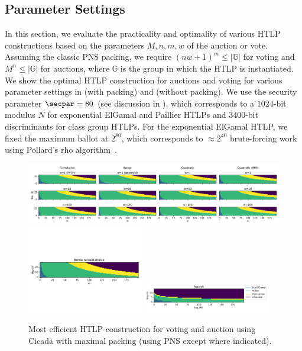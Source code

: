 \subsection{Parameter Settings}\label{sec:htlp-choice}

In this section, we evaluate the practicality and optimality of various HTLP constructions based on the parameters $M,n,m,w$ of the auction or vote. 
Assuming the classic PNS packing, we require $(nw+1)^m\leq\vert\mathbb{G}\vert$ for voting and $M^n\leq\vert\mathbb{G}\vert$ for auctions, where $\mathbb{G}$ is the group in which the HTLP is instantiated.
We show the optimal HTLP construction for auctions and voting for various parameter settings in  (with packing) and  (without packing). We use the security parameter $\secpar=80$ (see discussion in ), which corresponds to a $1024$-bit modulus $N$ for exponential ElGamal and Paillier HTLPs and $3400$-bit discriminants for class group HTLPs. For the exponential ElGamal HTLP, we fixed the maximum ballot at $2^{80}$, which corresponds to $\approx 2^{40}$ brute-forcing work using Pollard's rho algorithm~\cite{Pollard78}.

\begin{figure}[tb!]
    \centering
    \includegraphics[width=1.2\textwidth]{cicada/figs/params/pack_crq.pdf}
    \centering  \includegraphics[width=0.45\textwidth,trim={0cm 3cm 0cm 4.5cm},clip]{cicada/figs/params/pack_borda.pdf}  \includegraphics[width=0.5\textwidth,trim={0cm -1cm 0cm 4.5cm}]{cicada/figs/params/pack_auction.pdf}
    \caption{Most efficient HTLP construction for voting and auction using Cicada with maximal packing (using PNS except where indicated).}
    \label{fig:packed_feasibility}
\end{figure}

